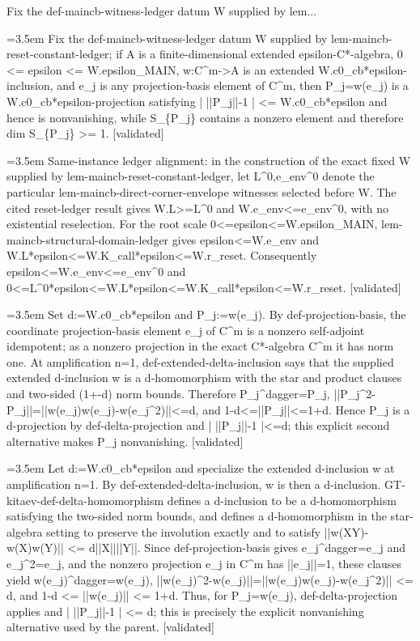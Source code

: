 \documentclass{article}
\newcommand{\step}[1]{\par\noindent\hangindent=3.5em\hangafter=1%
  \makebox[3.5em][l]{\textbf{#1.}}}
\newcommand{\steptag}[1]{\hfill{\small\textsf{[#1]}}}
\begin{document}
\begin{proofbox}{Fix the def-maincb-witness-ledger datum W supplied by lem...}
\step{1} Fix the def-maincb-witness-ledger datum W supplied by lem-maincb-reset-constant-ledger; if A is a finite-dimensional extended epsilon-C*-algebra, 0 <= epsilon <= W.epsilon\_MAIN, w:C\textasciicircum{}m->A is an extended W.c0\_cb*epsilon-inclusion, and e\_j is any projection-basis element of C\textasciicircum{}m, then P\_j=w(e\_j) is a W.c0\_cb*epsilon-projection satisfying | ||P\_j||-1 | <= W.c0\_cb*epsilon and hence is nonvanishing, while S\_\{P\_j\} contains a nonzero element and therefore dim S\_\{P\_j\} >= 1. \steptag{validated} \\[6pt]
\step{1.1} Same-instance ledger alignment: in the construction of the exact fixed W supplied by lem-maincb-reset-constant-ledger, let L\textasciicircum{}0,e\_env\textasciicircum{}0 denote the particular lem-maincb-direct-corner-envelope witnesses selected before W. The cited reset-ledger result gives W.L>=L\textasciicircum{}0 and W.e\_env<=e\_env\textasciicircum{}0, with no existential reselection. For the root scale 0<=epsilon<=W.epsilon\_MAIN, lem-maincb-structural-domain-ledger gives epsilon<=W.e\_env and W.L*epsilon<=W.K\_call*epsilon<=W.r\_reset. Consequently epsilon<=W.e\_env<=e\_env\textasciicircum{}0 and 0<=L\textasciicircum{}0*epsilon<=W.L*epsilon<=W.K\_call*epsilon<=W.r\_reset. \steptag{validated} \\[4pt]
\step{1.2} Set d:=W.c0\_cb*epsilon and P\_j:=w(e\_j). By def-projection-basis, the coordinate projection-basis element e\_j of C\textasciicircum{}m is a nonzero self-adjoint idempotent; as a nonzero projection in the exact C*-algebra C\textasciicircum{}m it has norm one. At amplification n=1, def-extended-delta-inclusion says that the supplied extended d-inclusion w is a d-homomorphism with the star and product clauses and two-sided (1+-d) norm bounds. Therefore P\_j\textasciicircum{}dagger=P\_j, ||P\_j\textasciicircum{}2-P\_j||=||w(e\_j)w(e\_j)-w(e\_j\textasciicircum{}2)||<=d, and 1-d<=||P\_j||<=1+d. Hence P\_j is a d-projection by def-delta-projection and | ||P\_j||-1 |<=d; this explicit second alternative makes P\_j nonvanishing. \steptag{validated} \\[6pt]
\step{1.2.1} Let d:=W.c0\_cb*epsilon and specialize the extended d-inclusion w at amplification n=1. By def-extended-delta-inclusion, w is then a d-inclusion. GT-kitaev-def-delta-homomorphism defines a d-inclusion to be a d-homomorphism satisfying the two-sided norm bounds, and defines a d-homomorphism in the star-algebra setting to preserve the involution exactly and to satisfy ||w(XY)-w(X)w(Y)|| <= d||X||||Y||. Since def-projection-basis gives e\_j\textasciicircum{}dagger=e\_j and e\_j\textasciicircum{}2=e\_j, and the nonzero projection e\_j in C\textasciicircum{}m has ||e\_j||=1, these clauses yield w(e\_j)\textasciicircum{}dagger=w(e\_j), ||w(e\_j)\textasciicircum{}2-w(e\_j)||=||w(e\_j)w(e\_j)-w(e\_j\textasciicircum{}2)|| <= d, and 1-d <= ||w(e\_j)|| <= 1+d. Thus, for P\_j=w(e\_j), def-delta-projection applies and | ||P\_j||-1 | <= d; this is precisely the explicit nonvanishing alternative used by the parent. \steptag{validated} \\[4pt]

\end{proofbox}
\end{document}
